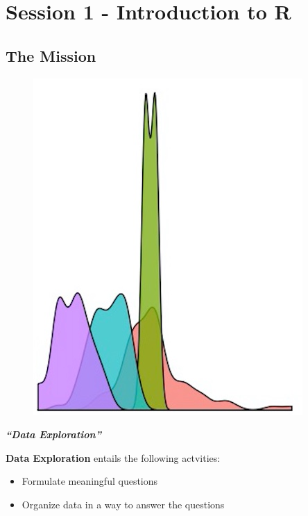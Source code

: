 \documentclass[15pt]{book}\usepackage[]{graphicx}\usepackage[]{color}
\begin{document}

\cleardoublepage
\chapter*{Session 1 - Introduction to R}
  \section*{The Mission}
  \begin{figure}[ht]
      \centering
      \includegraphics[width = 8 cm]{./viz/ext/densityplotIcon.jpeg}
    \end{figure}
  {\centering\textbf{\emph{\Huge ``Data Exploration''}} \\}
  
  
  \newpage
  \textbf{Data Exploration} entails the following actvities:
  \begin{itemize}
      \item Formulate meaningful questions
      \item Organize data in a way to answer the questions
  \end{itemize}

\end{document}
